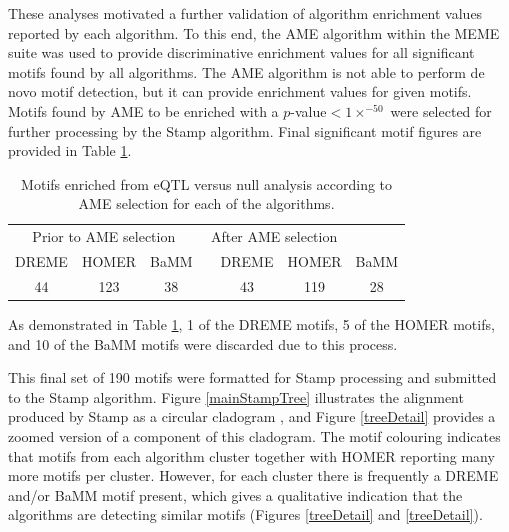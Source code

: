 \documentclass[12pt]{article}
\begin{document}
These analyses motivated a further validation of algorithm enrichment values reported by each algorithm. To this end, the AME algorithm \citep{Buske2010} within the MEME suite  was used to provide discriminative enrichment values for all significant motifs found by all algorithms. The AME algorithm is not able to perform de novo motif detection, but it can provide enrichment values for given motifs. Motifs found by AME to be enriched with a $p$-value$<1\times^{-50}$ were selected for further processing by the Stamp algorithm. Final significant motif figures are provided in Table \ref{ameResults}.

\begin{table}[!htbp]
\caption{Motifs enriched from eQTL versus null analysis according to AME selection for each of the algorithms.}
\label{ameResults}
\centering
\begin{tabular}{ccccccc}
\toprule[0.2em]
\multicolumn{3}{c}{Prior to AME selection} & \multicolumn{3}{c}{After AME selection}\\
\cmidrule[0.1em]{1-3}
\cmidrule[0.1em]{5-7}
DREME & HOMER & BaMM && DREME & HOMER & BaMM\\
44 & 123 & 38 && 43 & 119 & 28\\
\bottomrule[0.2em]
\end{tabular}
\end{table}
\newpage
As demonstrated in Table \ref{ameResults}, 1 of the DREME motifs, 5 of the HOMER motifs, and 10 of the BaMM motifs were discarded due to this process. 

This final set of 190 motifs were formatted for Stamp processing and submitted to the Stamp algorithm. Figure \ref{mainStampTree} illustrates the alignment produced by Stamp as a circular cladogram \citep{He2016}, and Figure \ref{treeDetail} provides a zoomed version of a component of this cladogram.   The motif colouring indicates that motifs from each algorithm cluster together with HOMER reporting many more motifs per cluster. However, for each cluster
there is frequently a DREME and/or BaMM motif present, which gives a qualitative indication that the algorithms are detecting similar motifs (Figures \ref{treeDetail} and \ref{treeDetail}).
\end{document}

